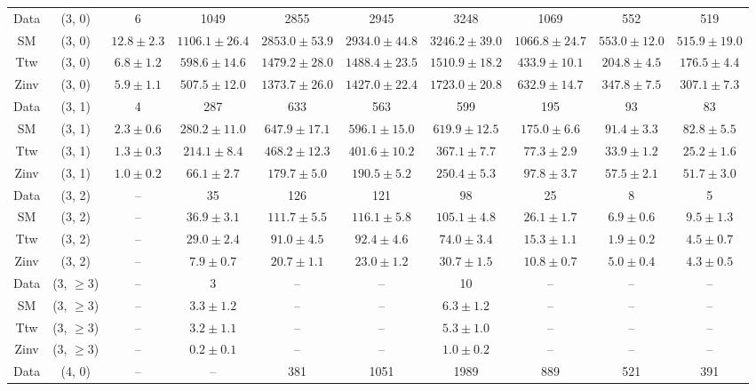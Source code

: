 \begin{table}[h!]
{\begin{tabular}{cccccccccc}
	Data & (3, 0) & 6 & 1049 & 2855 & 2945 & 3248 & 1069 & 552 & 519 \\[0.5ex] 
	SM & (3, 0) & $12.8\pm 2.3$ & $1106.1\pm 26.4$ & $2853.0\pm 53.9$ & $2934.0\pm 44.8$ & $3246.2\pm 39.0$ & $1066.8\pm 24.7$ & $553.0\pm 12.0$ & $515.9\pm 19.0$ \\[0.5ex] 
	Ttw & (3, 0) & $6.8\pm 1.2$ & $598.6\pm 14.6$ & $1479.2\pm 28.0$ & $1488.4\pm 23.5$ & $1510.9\pm 18.2$ & $433.9\pm 10.1$ & $204.8\pm 4.5$ & $176.5\pm 4.4$ \\[0.5ex] 
	Zinv & (3, 0) & $5.9\pm 1.1$ & $507.5\pm 12.0$ & $1373.7\pm 26.0$ & $1427.0\pm 22.4$ & $1723.0\pm 20.8$ & $632.9\pm 14.7$ & $347.8\pm 7.5$ & $307.1\pm 7.3$ \\[0.5ex] 
	Data & (3, 1) & 4 & 287 & 633 & 563 & 599 & 195 & 93 & 83 \\[0.5ex] 
	SM & (3, 1) & $2.3\pm 0.6$ & $280.2\pm 11.0$ & $647.9\pm 17.1$ & $596.1\pm 15.0$ & $619.9\pm 12.5$ & $175.0\pm 6.6$ & $91.4\pm 3.3$ & $82.8\pm 5.5$ \\[0.5ex] 
	Ttw & (3, 1) & $1.3\pm 0.3$ & $214.1\pm 8.4$ & $468.2\pm 12.3$ & $401.6\pm 10.2$ & $367.1\pm 7.7$ & $77.3\pm 2.9$ & $33.9\pm 1.2$ & $25.2\pm 1.6$ \\[0.5ex] 
	Zinv & (3, 1) & $1.0\pm 0.2$ & $66.1\pm 2.7$ & $179.7\pm 5.0$ & $190.5\pm 5.2$ & $250.4\pm 5.3$ & $97.8\pm 3.7$ & $57.5\pm 2.1$ & $51.7\pm 3.0$ \\[0.5ex] 
	Data & (3, 2) & -- & 35 & 126 & 121 & 98 & 25 & 8 & 5 \\[0.5ex] 
	SM & (3, 2) & -- & $36.9\pm 3.1$ & $111.7\pm 5.5$ & $116.1\pm 5.8$ & $105.1\pm 4.8$ & $26.1\pm 1.7$ & $6.9\pm 0.6$ & $9.5\pm 1.3$ \\[0.5ex] 
	Ttw & (3, 2) & -- & $29.0\pm 2.4$ & $91.0\pm 4.5$ & $92.4\pm 4.6$ & $74.0\pm 3.4$ & $15.3\pm 1.1$ & $1.9\pm 0.2$ & $4.5\pm 0.7$ \\[0.5ex] 
	Zinv & (3, 2) & -- & $7.9\pm 0.7$ & $20.7\pm 1.1$ & $23.0\pm 1.2$ & $30.7\pm 1.5$ & $10.8\pm 0.7$ & $5.0\pm 0.4$ & $4.3\pm 0.5$ \\[0.5ex] 
	Data & (3, $\ge3$) & -- & 3 & -- & -- & 10 & -- & -- & -- \\[0.5ex] 
	SM & (3, $\ge3$) & -- & $3.3\pm 1.2$ & -- & -- & $6.3\pm 1.2$ & -- & -- & -- \\[0.5ex] 
	Ttw & (3, $\ge3$) & -- & $3.2\pm 1.1$ & -- & -- & $5.3\pm 1.0$ & -- & -- & -- \\[0.5ex] 
	Zinv & (3, $\ge3$) & -- & $0.2\pm 0.1$ & -- & -- & $1.0\pm 0.2$ & -- & -- & -- \\[0.5ex] 
	Data & (4, 0) & -- & -- & 381 & 1051 & 1989 & 889 & 521 & 391 \\[0.5ex] 

\end{tabular}}
\end{table}

